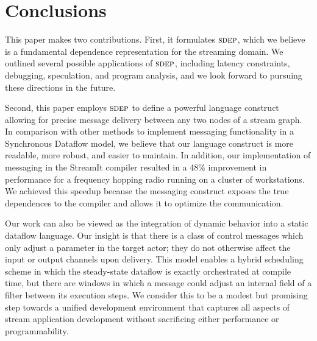 \section{Conclusions}

This paper makes two contributions.  First, it formulates $\textsc{sdep}$,
which we believe is a fundamental dependence representation for the
streaming domain.  We outlined several possible applications of
$\textsc{sdep}$, including latency constraints, debugging, speculation, and
program analysis, and we look forward to pursuing these directions in
the future.

Second, this paper employs $\textsc{sdep}$ to define a powerful language
construct allowing for precise message delivery between any two nodes
of a stream graph.  In comparison with other methods to implement
messaging functionality in a Synchronous Dataflow model, we believe
that our language construct is more readable, more robust, and easier
to maintain.  In addition, our implementation of messaging in the
StreamIt compiler resulted in a 48\% improvement in performance for a
frequency hopping radio running on a cluster of workstations.  We
achieved this speedup because the messaging construct exposes the true
dependences to the compiler and allows it to optimize the
communication.

Our work can also be viewed as the integration of dynamic behavior
into a static dataflow language.  Our insight is that there is a class
of control messages which only adjust a parameter in the target actor;
they do not otherwise affect the input or output channels upon
delivery.  This model enables a hybrid scheduling scheme in which the
steady-state dataflow is exactly orchestrated at compile time, but
there are windows in which a message could adjust an internal field of
a filter between its execution steps.  We consider this to be a modest
but promising step towards a unified development environment that
captures all aspects of stream application development without
sacrificing either performance or programmability.
